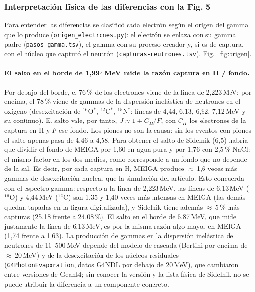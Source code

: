 \documentclass[11pt,a4paper]{article}
\begin{document}
\subsubsection{Interpretación física de las diferencias con la Fig. 5}\label{sec:interp_fig5}
Para entender las diferencias se clasificó cada electrón según el origen del gamma que lo produce (\texttt{origen\_electrones.py}): el electrón se enlaza con su gamma padre
(\texttt{pasos-gamma.tsv}), el gamma con su proceso creador y, si es de captura, con el núcleo que capturó el neutrón (\texttt{capturas-neutrones.tsv}). Fig.~\ref{fig:origen}.
\paragraph{El salto en el borde de 1,994\,MeV mide la razón captura en H / fondo.} Por debajo del borde, el 76\,\% de los electrones viene de la línea de 2,223\,MeV;
por encima, el 78\,\% viene de gammas de la dispersión inelástica de neutrones en el oxígeno (desexcitación de $^{16}$O$^*$, $^{12}$C$^*$, $^{15}$N$^*$: líneas de 4,44, 6,13, 6,92, 7,12\,MeV y su continuo).
El salto vale, por tanto, $J \approx 1 + C_H/F$, con $C_H$ los electrones de la captura en H y $F$ ese fondo. Los piones no son la causa: sin los eventos con piones el salto apenas pasa de 4,46 a 4,58.
Para obtener el salto de Sidelnik (6,5) habría que dividir el fondo de MEIGA por 1,60 en agua pura y por 1,76 con 2,5\,\% NaCl:
el mismo factor en los dos medios, como corresponde a un fondo que no depende de la sal. Es decir, por cada captura en H, MEIGA produce $\approx$\,1,6 veces más gammas de desexcitación nuclear que la simulación del artículo.
Esto concuerda con el espectro gamma: respecto a la línea de 2,223\,MeV, las líneas de 6,13\,MeV ($^{16}$O) y 4,44\,MeV ($^{12}$C) son 1,35 y 1,40 veces más intensas en MEIGA (las demás quedan tapadas en la figura digitalizada),
y Sidelnik tiene además $\approx$\,5\,\% más capturas (25,18 frente a 24,08\,\%). El salto en el borde de 5,87\,MeV, que mide justamente la línea de 6,13\,MeV, es por la misma razón algo mayor en MEIGA (1,74 frente a 1,63).
La producción de gammas en la dispersión inelástica de neutrones de 10--500\,MeV depende del modelo de cascada (Bertini por encima de $\approx$\,20\,MeV) y de la desexcitación de los núcleos residuales (\texttt{G4PhotonEvaporation}, datos G4NDL por debajo de 20\,MeV),
que cambiaron entre versiones de Geant4; sin conocer la versión y la lista física de Sidelnik no se puede atribuir la diferencia a un componente concreto.
\end{document}

